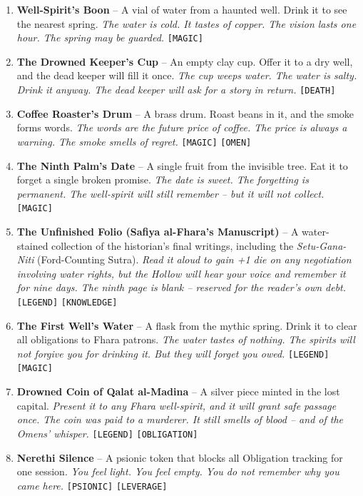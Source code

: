 \begin{enumerate}
\item \textbf{Well-Spirit's Boon} -- A vial of water from a haunted well. Drink it to see the nearest spring.
  \hfill \textit{The water is cold. It tastes of copper. The vision lasts one hour. The spring may be guarded.} \texttt{[MAGIC]}
\item[J] \textbf{The Drowned Keeper's Cup} -- An empty clay cup. Offer it to a dry well, and the dead keeper will fill it once.
  \hfill \textit{The cup weeps water. The water is salty. Drink it anyway. The dead keeper will ask for a story in return.} \texttt{[DEATH]}
\item[Q] \textbf{Coffee Roaster's Drum} -- A brass drum. Roast beans in it, and the smoke forms words.
  \hfill \textit{The words are the future price of coffee. The price is always a warning. The smoke smells of regret.} \texttt{[MAGIC]} \texttt{[OMEN]}
\item[K] \textbf{The Ninth Palm's Date} -- A single fruit from the invisible tree. Eat it to forget a single broken promise.
  \hfill \textit{The date is sweet. The forgetting is permanent. The well-spirit will still remember -- but it will not collect.} \texttt{[MAGIC]}
\item[L] \textbf{The Unfinished Folio (Safiya al-Fhara's Manuscript)} -- A water-stained collection of the historian's final writings, including the \textit{Setu-Gana-Niti} (Ford-Counting Sutra).
  \hfill \textit{Read it aloud to gain +1 die on any negotiation involving water rights, but the Hollow will hear your voice and remember it for nine days. The ninth page is blank -- reserved for the reader's own debt.} \texttt{[LEGEND]} \texttt{[KNOWLEDGE]}
\item[A] \textbf{The First Well's Water} -- A flask from the mythic spring. Drink it to clear all obligations to Fhara patrons.
  \hfill \textit{The water tastes of nothing. The spirits will not forgive you for drinking it. But they will forget you owed.} \texttt{[LEGEND]} \texttt{[MAGIC]}
\item[A+] \textbf{Drowned Coin of Qalat al-Madina} -- A silver piece minted in the lost capital.
  \hfill \textit{Present it to any Fhara well-spirit, and it will grant safe passage once. The coin was paid to a murderer. It still smells of blood -- and of the Omens' whisper.} \texttt{[LEGEND]} \texttt{[OBLIGATION]}
\item[N] \textbf{Nerethi Silence} -- A psionic token that blocks all Obligation tracking for one session.
  \hfill \textit{You feel light. You feel empty. You do not remember why you came here.} \texttt{[PSIONIC]} \texttt{[LEVERAGE]}
\end{enumerate}

